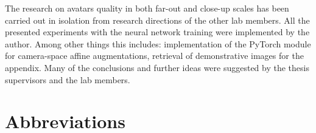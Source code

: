 The research on avatars quality in both far-out and close-up scales has been carried out in isolation from research directions of the other lab members. All the presented experiments with the neural network training were implemented by the author. Among other things this includes: implementation of the PyTorch module for camera-space affine augmentations, retrieval of demonstrative images for the appendix. Many of the conclusions and further ideas were suggested by the thesis supervisors and the lab members.
 
\newpage
\section*{\centering Abbreviations}


